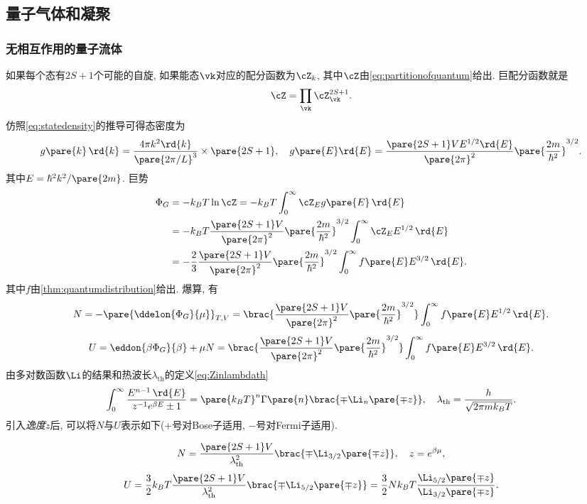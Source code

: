\documentclass[../Thermal.tex]{subfiles}
\begin{document}
\subsection{量子气体和凝聚}
\subsubsection{无相互作用的量子流体}
如果每个态有$2S+1$个可能的自旋, 如果能态$\vk$对应的配分函数为$\cZ_k$, 其中$\cZ$由\eqref{eq:partitionofquantum}给出. 巨配分函数就是
\[ \cZ = \prod_{\vk} \cZ_{\vk}^{2S+1}. \]
仿照\eqref{eq:statedensity}的推导可得态密度为
\[ g\pare{k}\,\rd{k} = \frac{4\pi k^2\rd{k}}{\pare{2\pi/L}^3}\times\pare{2S+1}, \quad g\pare{E}\rd{E} = \frac{\pare{2S+1}VE^{1/2}\rd{E}}{\pare{2\pi}^2}\pare{\frac{2m}{\hbar^2}}^{3/2}. \]
其中$E=\hbar^2k^2/\pare{2m}$. 巨势
\begin{align*}
\Phi_G &= -k_BT\ln \cZ = -k_BT\int_0^\infty \cZ_E g\pare{E}\,\rd{E} \\
&= -k_BT\frac{\pare{2S+1}V}{\pare{2\pi}^2}\pare{\frac{2m}{\hbar^2}}^{3/2}\int_0^\infty \cZ_E E^{1/2}\,\rd{E}\\
&= -\frac{2}{3} \frac{\pare{2S+1}V}{\pare{2\pi}^2}\pare{\frac{2m}{\hbar^2}}^{3/2}\int_0^\infty f\pare{E} E^{3/2}\,\rd{E}.
\end{align*}
其中$f$由\cref{thm:quantumdistribution}给出. 爆算, 有
\begin{equation}
\label{eq:Ninintegral}
N = -\pare{\ddelon{\Phi_G}{\mu}}_{T,V} = \brac{\frac{\pare{2S+1}V}{\pare{2\pi}^2}\pare{\frac{2m}{\hbar^2}}^{3/2}} \int_0^\infty f\pare{E} E^{1/2}\,\rd{E}.
\end{equation}
\begin{equation}
\label{eq:Uinintegral}
U = \eddon{\beta\Phi_G}{\beta} + \mu N = \brac{\frac{\pare{2S+1}V}{\pare{2\pi}^2}\pare{\frac{2m}{\hbar^2}}^{3/2}} \int_0^\infty f\pare{E} E^{3/2}\,\rd{E}.
\end{equation}
由多对数函数$\Li$的结果和热波长$\lambda_{\mathrm{th}}$的定义\eqref{eq:Zinlambdath}
\[ \int_0^\infty \frac{E^{n-1}\,\rd{E}}{z^{-1}e^{\beta E} \pm 1} = \pare{k_BT}^n\Gamma\pare{n}\brac{\mp \Li_n\pare{\mp z}},\quad \lambda_{\mathrm{th}} = \frac{h}{\sqrt{2\pi mk_B T}}. \]
引入\emph{逸度}$z$后, 可以将$N$与$U$表示如下($+$号对Bose子适用, $-$号对Fermi子适用).
\begin{finale}
\[ N = \frac{\pare{2S+1}V}{\lambda_{\mathrm{th}}^2}\brac{\mp \Li_{3/2}\pare{\mp z}},\quad z = e^{\beta\mu}, \]
\[ U = \frac{3}{2}k_B T \frac{\pare{2S+1}V}{\lambda_{\mathrm{th}}^2}\brac{\mp \Li_{5/2}\pare{\mp z}} = \frac{3}{2}Nk_B T \frac{\Li_{5/2}\pare{\mp z}}{\Li_{3/2}\pare{\mp z}}. \]
\end{finale}
\end{document}
